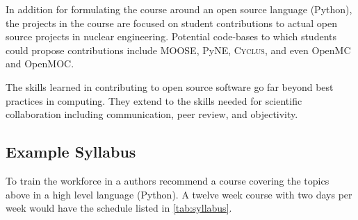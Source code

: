 \documentclass{anstrans}
\begin{document}
In addition for formulating the course around an open source language (Python),
the projects in the course are focused on student contributions to actual open source
projects in nuclear engineering. Potential code-bases to which students could
propose contributions include MOOSE\cite{gaston_moose:_2009},
PyNE\cite{scopatz_pyne:_2012}, \textsc{Cyclus}\cite{carlsen_cyclus_2014}, and
even OpenMC\cite{romano_openmc_2013} and OpenMOC\cite{boyd_openmoc_2014}.

The skills learned in contributing to open source software go far beyond best
practices in computing. They extend to the skills needed for scientific
collaboration including communication, peer review, and objectivity.

\subsection{Example Syllabus}

To train the workforce in a authors recommend a course covering the topics
above in a high level language (Python). A twelve week course with two days per
week would have the schedule listed in \tablename \ref{tab:syllabus}.
\end{document}
